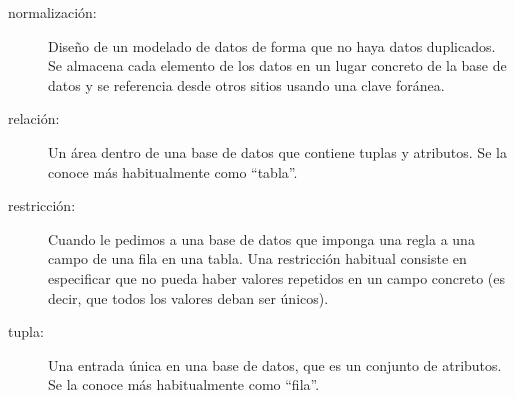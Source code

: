 \begin{description}
\item[normalización:] Diseño de un modelado de datos de forma que no haya datos
duplicados. Se almacena cada elemento de los datos en un lugar concreto de la base de datos
y se referencia desde otros sitios usando una clave foránea.

\item[relación:] Un área dentro de una base de datos que contiene tuplas y
atributos. Se la conoce más habitualmente como ``tabla''.

\item[restricción:]
Cuando le pedimos a una base de datos que imponga una regla a una campo de una fila
en una tabla. Una restricción habitual consiste en especificar que no pueda haber
valores repetidos en un campo concreto (es decir, que todos los valores deban ser únicos). 

\item[tupla:] Una entrada única en una base de datos, que es un conjunto
de atributos. Se la conoce más habitualmente como ``fila''.

\end{description}